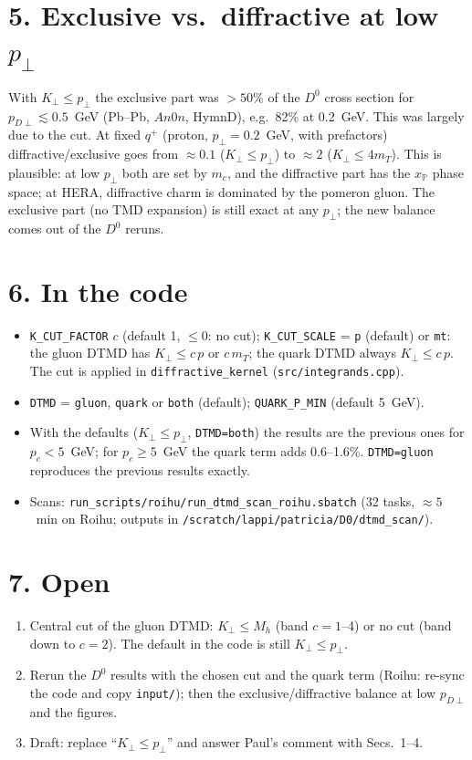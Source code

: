 \documentclass[12pt]{article}
\newcommand{\xpo}{x_{\mathbb{P}}}
\begin{document}
\section*{5. Exclusive vs.\ diffractive at low $p_\perp$}

With $K_\perp\leq p_\perp$ the exclusive part was $>50\%$ of the $D^0$ cross section for
$p_{D\perp}\lesssim0.5$~GeV (Pb--Pb, $An0n$, HymnD), e.g.\ 82\% at 0.2~GeV. This was largely due to the
cut. At fixed $q^+$ (proton, $p_\perp=0.2$~GeV, with prefactors) diffractive/exclusive goes from
$\approx0.1$ ($K_\perp\leq p_\perp$) to $\approx2$ ($K_\perp\leq4m_T$). This is plausible: at low
$p_\perp$ both are set by $m_c$, and the diffractive part has the $\xpo$ phase space; at HERA,
diffractive charm is dominated by the pomeron gluon. The exclusive part (no TMD expansion) is still exact
at any $p_\perp$; the new balance comes out of the $D^0$ reruns.

\section*{6. In the code}

\begin{itemize}
\item \texttt{K\_CUT\_FACTOR} $c$ (default 1, $\leq0$: no cut); \texttt{K\_CUT\_SCALE} = \texttt{p}
  (default) or \texttt{mt}: the gluon DTMD has $K_\perp\leq c\,p$ or $c\,m_T$; the quark DTMD always
  $K_\perp\leq c\,p$. The cut is applied in \texttt{diffractive\_kernel} (\texttt{src/integrands.cpp}).
\item \texttt{DTMD} = \texttt{gluon}, \texttt{quark} or \texttt{both} (default);
  \texttt{QUARK\_P\_MIN} (default 5~GeV).
\item With the defaults ($K_\perp\leq p_\perp$, \texttt{DTMD=both}) the results are the previous ones
  for $p_c<5$~GeV; for $p_c\geq5$~GeV the quark term adds 0.6--1.6\%. \texttt{DTMD=gluon} reproduces the
  previous results exactly.
\item Scans: \texttt{run\_scripts/roihu/run\_dtmd\_scan\_roihu.sbatch} (32 tasks, $\approx5$~min on
  Roihu; outputs in \texttt{/scratch/lappi/patricia/D0/dtmd\_scan/}).
\end{itemize}

\section*{7. Open}

\begin{enumerate}
\item Central cut of the gluon DTMD: $K_\perp\leq M_h$ (band $c=1$--4) or no cut (band down to $c=2$).
  The default in the code is still $K_\perp\leq p_\perp$.
\item Rerun the $D^0$ results with the chosen cut and the quark term (Roihu: re-sync the code and copy
  \texttt{input/}); then the exclusive/diffractive balance at low $p_{D\perp}$ and the figures.
\item Draft: replace ``$K_\perp\leq p_\perp$'' and answer Paul's comment with Secs.~1--4.
\end{enumerate}
\end{document}
